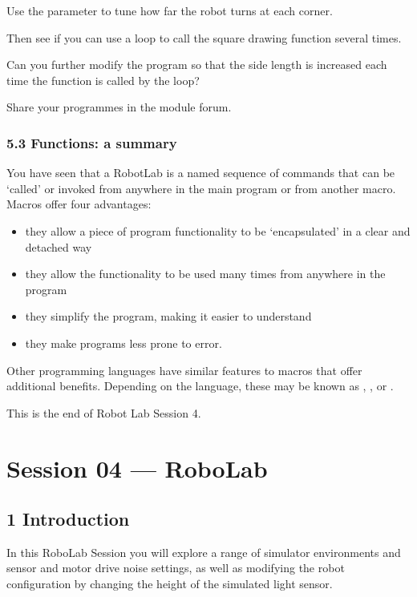 \documentclass[letterpaper,10pt,english]{sphinxmanual}
\begin{document}
Use the  parameter to tune how far the robot turns at each corner.

Then see if you can use a  loop to call the square drawing function several times.

Can you further modify the program so that the side length is increased each time the function is called by the loop?

Share your programmes in the module forum.


\subsubsection{5.3 Functions: a summary}
\label{\detokenize{content/03_Robot_Lab/Section_00_05:5.3-Functions:-a-summary}}
You have seen that a RobotLab  is a named sequence of commands that can be ‘called’ or invoked from anywhere in the main program or from another macro. Macros offer four advantages:
\begin{itemize}
\item {} 
they allow a piece of program functionality to be ‘encapsulated’ in a clear and detached way

\item {} 
they allow the functionality to be used many times from anywhere in the program

\item {} 
they simplify the program, making it easier to understand

\item {} 
they make programs less prone to error.

\end{itemize}

Other programming languages have similar features to macros that offer additional benefits. Depending on the language, these may be known as , ,  or .

This is the end of Robot Lab Session 4.


\section{Session 04 — RoboLab}
\label{\detokenize{index:session-04-robolab}}

\subsection{1 Introduction}
\label{\detokenize{content/04_Robot_Lab/Section_00_01:1-Introduction}}\label{\detokenize{content/04_Robot_Lab/Section_00_01::doc}}
In this RoboLab Session you will explore a range of simulator environments and sensor and motor drive noise settings, as well as modifying the robot configuration by changing the height of the simulated light sensor.
\end{document}
